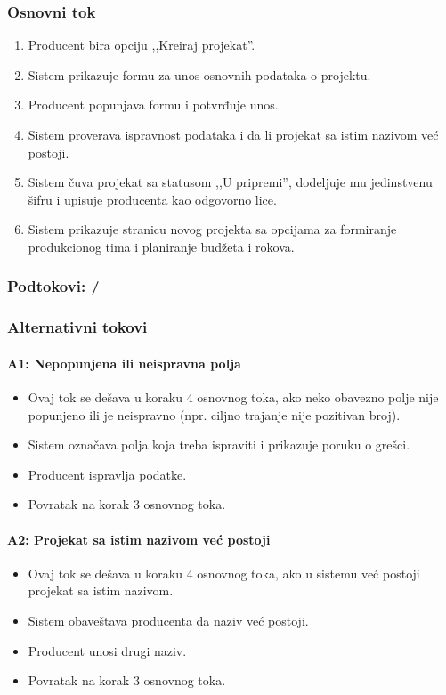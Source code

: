 \subsubsection*{Osnovni tok}
\begin{enumerate}
    \item Producent bira opciju ,,Kreiraj projekat''.
    \item Sistem prikazuje formu za unos osnovnih podataka o projektu.
    \item Producent popunjava formu i potvrđuje unos.
    \item Sistem proverava ispravnost podataka i da li projekat sa istim nazivom već postoji.
    \item Sistem čuva projekat sa statusom ,,U pripremi'', dodeljuje mu jedinstvenu šifru i upisuje producenta kao odgovorno lice.
    \item Sistem prikazuje stranicu novog projekta sa opcijama za formiranje produkcionog tima i planiranje budžeta i rokova.
\end{enumerate}

\subsubsection*{Podtokovi: /}

\subsubsection*{Alternativni tokovi}

\paragraph*{A1: Nepopunjena ili neispravna polja}
\begin{itemize}
    \item Ovaj tok se dešava u koraku 4 osnovnog toka, ako neko obavezno polje nije popunjeno ili je neispravno (npr. ciljno trajanje nije pozitivan broj).
    \item Sistem označava polja koja treba ispraviti i prikazuje poruku o grešci.
    \item Producent ispravlja podatke.
    \item Povratak na korak 3 osnovnog toka.
\end{itemize}

\paragraph*{A2: Projekat sa istim nazivom već postoji}
\begin{itemize}
    \item Ovaj tok se dešava u koraku 4 osnovnog toka, ako u sistemu već postoji projekat sa istim nazivom.
    \item Sistem obaveštava producenta da naziv već postoji.
    \item Producent unosi drugi naziv.
    \item Povratak na korak 3 osnovnog toka.
\end{itemize}

